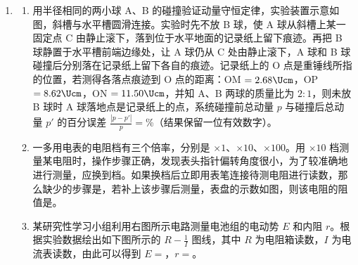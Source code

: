 \documentclass[\gkver]{gaokaozhenti}
\begin{document}
\begin{enumerate}

\item
\begin{enumerate}
	\item
	用半径相同的两小球 A、B 的碰撞验证动量守恒定律，实验装置示意如图，斜槽与水平槽圆滑连接。实验时先不放 B 球，使 A 球从斜槽上某一固定点 C 由静止滚下，落到位于水平地面的记录纸上留下痕迹。再把 B 球静置于水平槽前端边缘处，让 A 球仍从 C 处由静止滚下，A 球和 B 球碰撞后分别落在记录纸上留下各自的痕迹。记录纸上的 O 点是重锤线所指的位置，若测得各落点痕迹到 O 点的距离：OM $=2.68\Ucm$，OP $=8.62\Ucm$，ON $=11.50\Ucm$，并知 A、B 两球的质量比为 $2:1$，则未放 B 球时 A 球落地点是记录纸上的点，系统碰撞前总动量 $p$ 与碰撞后总动量 $p'$ 的百分误差 $\frac{|p-p'|}{p}=$\%（结果保留一位有效数字）。


	\item
	一多用电表的电阻档有三个倍率，分别是 $\times 1$、$\times 10$、$\times 100$。用 $\times 10$ 档测量某电阻时，操作步骤正确，发现表头指针偏转角度很小，为了较准确地进行测量，应换到档。如果换档后立即用表笔连接待测电阻进行读数，那么缺少的步骤是，若补上该步骤后测量，表盘的示数如图，则该电阻的阻值是。


	\item
	某研究性学习小组利用右图所示电路测量电池组的电动势 $E$ 和内阻 $r$。根据实验数据绘出如下图所示的 $R-\frac{1}{I}$ 图线，其中 $R$ 为电阻箱读数，$I$ 为电流表读数，由此可以得到 $E=$\tkanswer[1.5cm]{$2.9\UV$}，$r=$\tkanswer[1.5cm]{$0.9\UO$}。

	\twopicture[align=right, showlabel=false, hA=3.00cm, hB=6.55cm]
	{}
	{}
\end{enumerate}

\end{enumerate}
\end{document}
